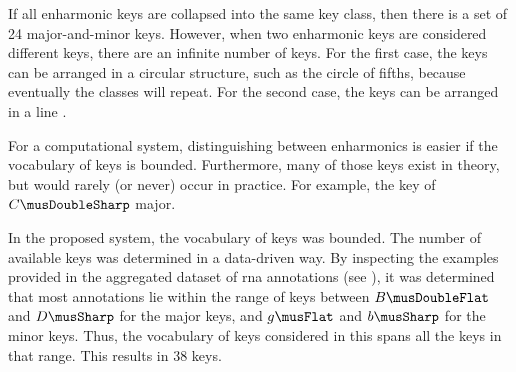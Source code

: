 
If all enharmonic keys are collapsed into the same key
class, then there is a set of 24 major-and-minor keys.
However, when two enharmonic keys are considered different
keys, there are an infinite number of keys. For the first
case, the keys can be arranged in a circular structure, such
as the circle of fifths, because eventually the classes will
repeat. For the second case, the keys can be arranged in a
line \parencite{temperley2000line}.

For a computational system, distinguishing between
enharmonics is easier if the vocabulary of keys is bounded.
Furthermore, many of those keys exist in theory, but would
rarely (or never) occur in practice. For example, the key of
$C\musDoubleSharp$ major.

In the proposed system, the vocabulary of keys was bounded.
The number of available keys was determined in a data-driven
way. By inspecting the examples provided in the aggregated
dataset of \gls{rna} annotations (see
), it was determined
that most annotations lie within the range of keys between
$B\musDoubleFlat$ and $D\musSharp$ for the major keys, and
$g\musFlat$ and $b\musSharp$ for the minor keys. Thus, the
vocabulary of keys considered in this \thesisdiss{} spans
all the keys in that range. This results in 38 keys.
